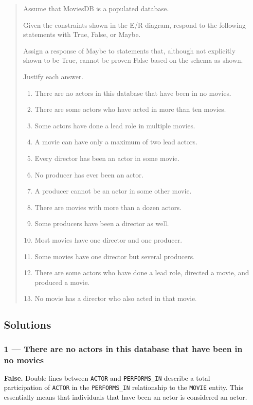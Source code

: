 \begin{quote}
  Assume that MoviesDB is a populated database.

	Given the constraints shown in the E/R diagram,
	respond to the following statements with True, False, or Maybe.

	Assign a response of Maybe to statements that, although not explicitly
  shown to be True, cannot be proven False based on the schema as shown.

  Justify each answer.

  \begin{enumerate}
    \item
      There are no actors in this database that have been in no movies.
    \item
      There are some actors who have acted in more than ten movies.
    \item
      Some actors have done a lead role in multiple movies.
    \item
      A movie can have only a maximum of two lead actors.
    \item
      Every director has been an actor in some movie.
    \item
      No producer has ever been an actor.
    \item
      A producer cannot be an actor in some other movie.
    \item
      There are movies with more than a dozen actors.
    \item
      Some producers have been a director as well.
    \item
      Most movies have one director and one producer.
    \item
      Some movies have one director but several producers.
    \item
      There are some actors who have done a lead role, directed a movie,
      and produced a movie.
    \item
      No movie has a director who also acted in that movie.
  \end{enumerate}
\end{quote}


\subsection{Solutions}

\subsubsection{1 --- There are no actors in this database that have been in no movies}
\textbf{False.} Double lines between \texttt{ACTOR} and \texttt{PERFORMS\_IN}
describe a total participation of \texttt{ACTOR} in the \texttt{PERFORMS\_IN}
relationship to the \texttt{MOVIE} entity.
This essentially means that individuals that have been an actor is considered
an actor.



